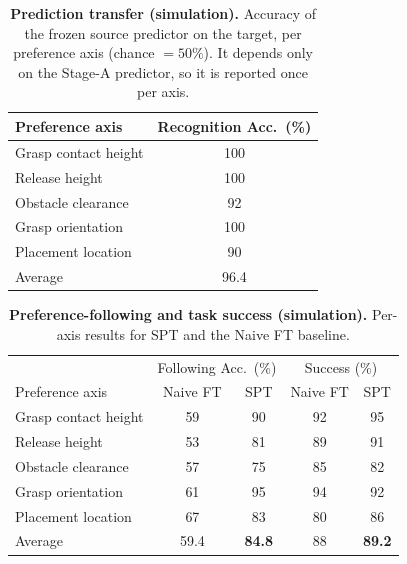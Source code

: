 \documentclass{article}
\begin{document}
\begin{table}[t]
  \centering
  \small
  \caption{\textbf{Prediction transfer (simulation).} Accuracy of the frozen
  source predictor on the target, per preference axis (chance $=50\%$). It
  depends only on the Stage-A predictor, so it is reported once per axis.}
  \label{tab:sim_recognition}
  \begin{tabular}{lc}
    \hline
    Preference axis & Recognition Acc.\ (\%) \\
    \hline
    Grasp contact height & 100 \\
    Release height       & 100 \\
    Obstacle clearance   & 92 \\
    Grasp orientation    & 100 \\
    Placement location   & 90 \\
    \hline
    Average              & 96.4 \\
    \hline
  \end{tabular}
\end{table}

\begin{table}[t]
  \centering
  \small
  \caption{\textbf{Preference-following and task success (simulation).} Per-axis
  results for SPT and the Naive FT baseline.}
  \label{tab:sim_main}
  \begin{tabular}{lcccc}
    \hline
    & \multicolumn{2}{c}{Following Acc.\ (\%)} & \multicolumn{2}{c}{Success (\%)} \\
    Preference axis & Naive FT & SPT & Naive FT & SPT \\
    \hline
    Grasp contact height & 59 & 90 & 92 & 95 \\
    Release height       & 53 & 81 & 89 & 91 \\
    Obstacle clearance   & 57 & 75 & 85 & 82 \\
    Grasp orientation    & 61 & 95 & 94 & 92 \\
    Placement location   & 67 & 83 & 80 & 86 \\
    \hline
    Average              & 59.4 & \textbf{84.8} & 88 & \textbf{89.2} \\
    \hline
  \end{tabular}
\end{table}
\end{document}
